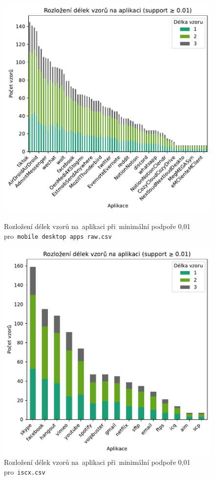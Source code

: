\begin{figure}[H]
	\centering
	\begin{minipage}[t]{0.5\textwidth}
		\centering
		\includegraphics[width=\linewidth]{obrazky-figures/exps/pattern_lengths_0.01_mobile.pdf}
		\caption{Rozložení délek vzorů na~aplikaci při~minimální podpoře 0{,}01 pro~\texttt{mobile desktop apps raw.csv}}
		\label{fig:ex2-mobile-patterns-len}
	\end{minipage}
	\hfill
	\begin{minipage}[t]{0.49\textwidth}
		\centering
		\includegraphics[width=\linewidth]{obrazky-figures/exps/pattern_lengths_0.01_iscx.pdf}
		\caption{Rozložení délek vzorů na~aplikaci při~minimální podpoře 0{,}01 pro~\texttt{iscx.csv}}
		\label{fig:ex2-iscx-patterns-len}
	\end{minipage}
\end{figure}

